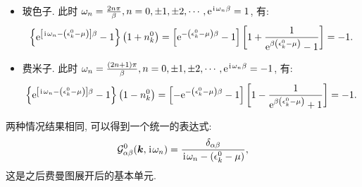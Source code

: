 \begin{itemize}
\item 玻色子. 此时 $\omega_n=\frac{2 n \pi}{\beta}, n=0, \pm 1, \pm 2, \cdots, \mathrm{e}^{\hspace{0.1em}\mathrm{i}\hspace{0.1em} \omega_n \beta}=1$, 有:
\begin{equation}
\left\{\mathrm{e}^{\left[\hspace{0.1em}\mathrm{i}\hspace{0.1em} \omega_n-\left(\epsilon_k^0-\mu\right)\right] \beta}-1\right\}\left(1+n_k^0\right)=\left[\mathrm{e}^{-\left(\epsilon_k^0-\mu\right) \beta}-1\right]\left[1+\frac{1}{\mathrm{e}^{\beta\left(\epsilon_k^0-\mu\right)}-1}\right]=-1 .
\end{equation}
\item 费米子. 此时 $\omega_n=\frac{(2 n+1) \pi}{\beta}, n=0, \pm 1, \pm 2, \cdots, \mathrm{e}^{\hspace{0.1em}\mathrm{i}\hspace{0.1em} \omega_n \beta}=-1$, 有:
\begin{equation}
\left\{\mathrm{e}^{\left[\hspace{0.1em}\mathrm{i}\hspace{0.1em} \omega_n-\left(\epsilon_k^0-\mu\right)\right] \beta}-1\right\}\left(1-n_k^0\right)=\left[-\mathrm{e}^{-\left(\epsilon_k^0-\mu\right) \beta}-1\right]\left[1-\frac{1}{\mathrm{e}^{\beta\left(\epsilon_k^0-\mu\right)}+1}\right]=-1 .
\end{equation}
\end{itemize}
两种情况结果相同, 可以得到一个统一的表达式:
\begin{equation}
\mathcal{G}_{\alpha \beta}^0(\boldsymbol{k}, \hspace{0.1em}\mathrm{i}\hspace{0.1em} \omega_n)=\frac{\delta_{\alpha \beta}}{\hspace{0.1em}\mathrm{i}\hspace{0.1em} \omega_n-\left(\epsilon_k^0-\mu\right)},
\end{equation}
这是之后费曼图展开后的基本单元.

